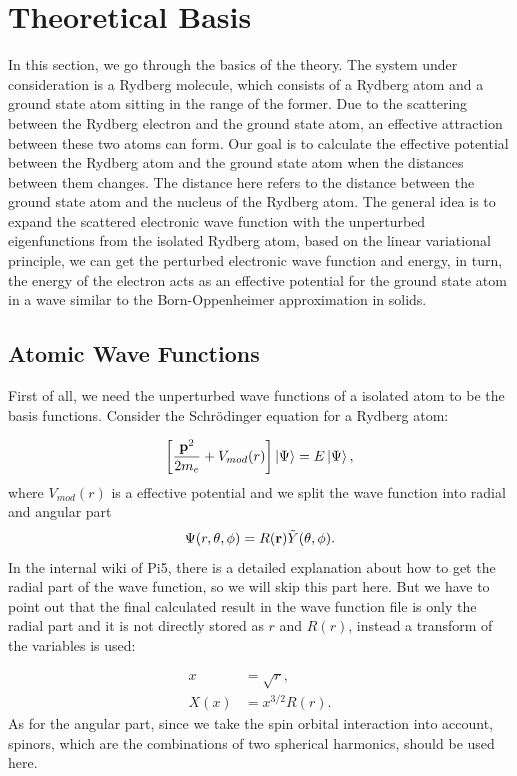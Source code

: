 \documentclass[british,english]{article}
\numberwithin{equation}{section}
\numberwithin{figure}{section}
\begin{document}
\section{Theoretical Basis}

In this section, we go through the basics of the theory. The system
under consideration is a Rydberg molecule, which consists of a Rydberg
atom and a ground state atom sitting in the range of the former. Due
to the scattering between the Rydberg electron and the ground state
atom, an effective attraction between these two atoms can form. Our
goal is to calculate the effective potential between the Rydberg atom
and the ground state atom when the distances between them changes.
The distance here refers to the distance between the ground state
atom and the nucleus of the Rydberg atom. The general idea is to expand
the scattered electronic wave function with the unperturbed eigenfunctions
from the isolated Rydberg atom, based on the linear variational principle,
we can get the perturbed electronic wave function and energy, in turn,
the energy of the electron acts as an effective potential for the
ground state atom in a wave similar to the Born-Oppenheimer approximation
in solids. 

\subsection{Atomic Wave Functions}

First of all, we need the unperturbed wave functions of a isolated
atom to be the basis functions. Consider the Schr\"odinger equation
for a Rydberg atom: 

\begin{equation}
\left[\frac{{\bf p}^{2}}{2m_{e}}+V_{mod}(r)\right]\Ket{\Psi}=E\Ket{\Psi},
\end{equation}
where $V_{mod}(r)$ is a effective potential and we split the wave
function into radial and angular part
\begin{equation}
\Psi(r,\theta,\phi)=R({\bf r})\tilde{Y}(\theta,\phi).
\label{equ:wavefun}
\end{equation}
In the internal wiki of Pi5, there is a detailed explanation about
how to get the radial part of the wave function, so we will skip this
part here. But we have to point out that the final calculated result
in the wave function file is only the radial part and it is not directly
stored as $r$ and $R(r)$, instead a transform of the variables is
used:

\begin{equation}
\begin{aligned}
x&=\sqrt{r},\\
X(x)&=x^{3/2}R(r).
\label{equ:trans}
\end{aligned}
\end{equation}As for the angular part, since we take the spin orbital interaction
into account, spinors, which are the combinations of two spherical
harmonics, should be used here.
\end{document}
